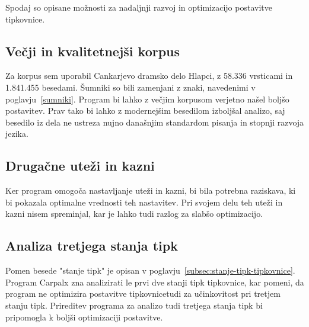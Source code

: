 

  Spodaj so opisane možnosti za nadaljnji razvoj in optimizacijo postavitve tipkovnice.

  \subsection{Večji in kvalitetnejši korpus}\label{subsec:večji-in-kvalitetnejši-korpus}

  Za korpus sem uporabil Cankarjevo dramsko delo Hlapci, z 58.336 vrsticami in 1.841.455 besedami.
  Šumniki so bili zamenjani z znaki, navedenimi v poglavju~\ref{sumniki}.
  Program bi lahko z večjim korpusom verjetno našel boljšo postavitev.
  Prav tako bi lahko z modernejšim besedilom izboljšal analizo,
  saj besedilo iz dela ne ustreza nujno današnjim standardom pisanja in stopnji razvoja jezika.

  \subsection{Drugačne uteži in kazni}\label{subsec:drugačne-uteži-in-kazni}

  Ker program omogoča nastavljanje uteži in kazni, bi bila potrebna raziskava, ki bi pokazala optimalne vrednosti teh nastavitev.
  Pri svojem delu teh uteži in kazni nisem spreminjal, kar je lahko tudi razlog za slabšo optimizacijo.

  \subsection{Analiza tretjega stanja tipk}\label{subsec:analiza-tretjega-stanja-tipk}

  Pomen besede "stanje tipk" je opisan v poglavju~\ref{subsec:stanje-tipk-tipkovnice}.
  Program Carpalx zna analizirati le prvi dve stanji tipk tipkovnice, kar pomeni,
  da program ne optimizira postavitve tipkovnicetudi za učinkovitost pri tretjem stanju tipk.
  Prireditev programa za analizo tudi tretjega stanja tipk bi pripomogla k boljši optimizaciji postavitve.

